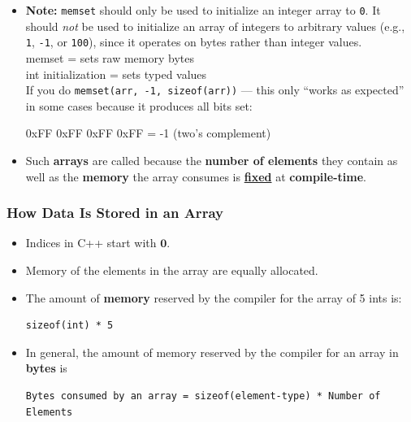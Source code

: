 \documentclass[10pt]{article}
\newcommand{\vocab}[1]{\fbox{\textbf{\textit{#1}}}}
\begin{document}
\begin{itemize}
	\item \textbf{Note:} \texttt{memset} should only be used to initialize an integer array to \texttt{0}. It should \emph{not} be used to initialize an array of integers to arbitrary values (e.g., \texttt{1}, \texttt{-1}, or \texttt{100}), since it operates on bytes rather than integer values.\\ 

	memset = sets raw memory bytes \\
int initialization = sets typed values\\ 

If you do \verb|memset(arr, -1, sizeof(arr))| --- this only “works as expected” in some cases because it produces all bits set:

0xFF 0xFF 0xFF 0xFF = -1 (two’s complement)\\

	\item Such \textbf{arrays} are called \vocab{static arrays} because the \textbf{number of elements} they contain as well as the \textbf{memory} the array consumes is \underline{\textbf{fixed}} at \textbf{compile-time}.
\end{itemize}

\newpage 

\subsubsection{How Data Is Stored in an Array}
\begin{itemize}
	\item Indices in C++ start with $\mathbf{0}$.
	\item Memory of the elements in the array are equally allocated.
	\item The amount of \textbf{memory} reserved by the compiler for the array of 5 ints is:
		\begin{verbatim}
sizeof(int) * 5
		\end{verbatim}

	\item In general, the amount of memory reserved by the compiler for an array in \textbf{bytes} is
		\begin{verbatim}
Bytes consumed by an array = sizeof(element-type) * Number of Elements
		\end{verbatim}
\end{itemize}

\newpage
\end{document}
